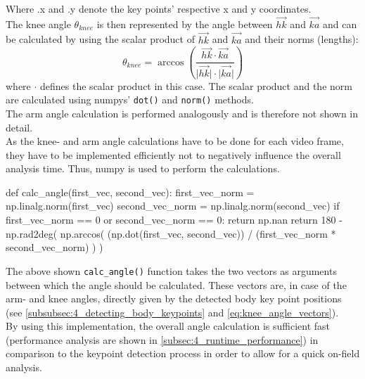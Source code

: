 \noindent Where .x and .y denote the key points' respective x and y coordinates.\\
The knee angle $\theta_{knee}$ is then represented by the angle
between $\vec{hk}$ and $\vec{ka}$ and can be calculated by using the scalar
product of $\vec{hk}$ and $\vec{ka}$ and their norms (lengths):
\begin{equation}\label{eq:knee_angle}
    \theta_{knee} = \arccos\left(\frac{\vec{hk} \cdot \vec{ka}}{\lvert \vec{hk} \rvert \cdot \lvert \vec{ka} \rvert}\right)
\end{equation}
where $\cdot$ defines the scalar product in this case.
The scalar product and the norm are calculated using numpys'
\texttt{dot()} and \texttt{norm()} methods.\\
The arm angle calculation is performed analogously and is therefore not shown
in detail.\\
As the knee- and arm angle calculations have to be done for each video frame,
they have to be implemented efficiently not to negatively influence the
overall analysis time.
Thus, numpy is used to perform the calculations.
\begin{pythoncode}[caption=Angle calculation,label=lst:angle_calc_algo]
    def calc_angle(first_vec, second_vec):
        first_vec_norm = np.linalg.norm(first_vec)
        second_vec_norm = np.linalg.norm(second_vec)
        if first_vec_norm == 0 or second_vec_norm == 0:
            return np.nan
        return 180 - np.rad2deg(
            np.arccos(
                (np.dot(first_vec, second_vec))
                / (first_vec_norm * second_vec_norm)
            )
        )
\end{pythoncode}
The above shown \texttt{calc\_angle()} function takes the two vectors as
arguments between which the angle should be calculated.
These vectors are, in case of the arm- and knee angles, directly given by the
detected body key point positions (see
\autoref{subsubsec:4_detecting_body_keypoints} and
\autoref{eq:knee_angle_vectors}).\\
By using this implementation, the overall angle calculation is sufficient fast
(performance analysis are shown in \autoref{subsec:4_runtime_performance})
in comparison to the keypoint detection process in order to allow for a quick
on-field analysis.

